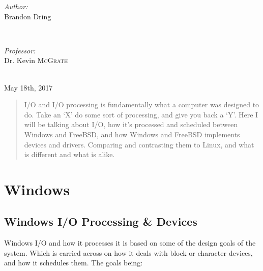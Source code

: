 \documentclass[10pt,conference,draftclsnofoot,onecolumn]{IEEEtran}
\begin{document}
\begin{titlepage}




\begin{minipage}{0.4\textwidth}
   \begin{flushleft} \large
      \emph{Author:}\\
      Brandon Dring
   \end{flushleft}
\end{minipage}
~
\begin{minipage}{0.4\textwidth}
   \begin{flushright} \large
      \emph{Professor:} \\
      Dr. Kevin \textsc{McGrath} %
   \end{flushright}
\end{minipage} \\ [4cm]

{\large May 18th, 2017}
\vfill %

\begin{abstract}
  I/O and I/O processing  is fundamentally what a computer was designed to do. Take an ‘X’ do some sort of processing, and give you back a ‘Y’. Here I will be talking about I/O, how it’s processed and scheduled between Windows and FreeBSD, and how Windows and FreeBSD implements devices and drivers. Comparing and contrasting them to Linux, and what is different and what is alike.
\end{abstract}


\pagebreak

\end{titlepage}
\newpage

\section{Windows}
\subsection{Windows I/O Processing \& Devices}


Windows I/O and how it processes it is based on some of the design goals of the system. Which is carried across on how it deals with block or character devices, and how it schedules them. The goals being: \\
\end{document}
